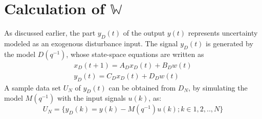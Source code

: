 \documentclass[letterpaper, 10 pt, conference]{ieeeconf}  %
\begin{document}
  \section{Calculation of $\mathbb{W}$}
  \noindent
  As discussed earlier, the part $y_D(t)$ of the output $y(t)$ represents uncertainty modeled as an exogenous disturbance input. The signal $y_D(t)$ is generated by the model $D(q^{-1})$, whose state-space equations are written as 
  \begin{equation}
  \begin{matrix}
  x_D(t+1) = A_Dx_D(t)+B_Dw(t)  \\
  y_D(t) = C_Dx_D(t)+D_Dw(t)
  \end{matrix}
  \label{ssD}
  \end{equation}
  A sample data set $U_N$ of $y_D(t)$ can be obtained from $D_N$, by simulating the model $M(q^{-1})$ with the input signals $u(k)$, as:
  \begin{equation}
  U_N=\{y_D(k)=y(k)-M(q^{-1})u(k);k \in 1,2,..,N\}
  \end{equation}

\end{document}
